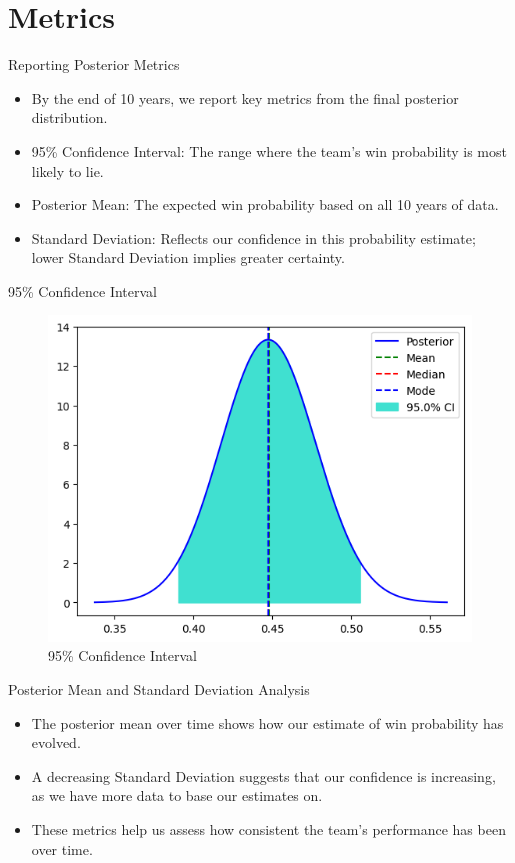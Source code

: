 \section{Metrics}

\begin{frame}{Reporting Posterior Metrics}

  \begin{itemize}
    \item By the end of 10 years, we report key metrics from the final posterior distribution.
    \item 95\% Confidence Interval: The range where the team’s win probability is most likely to lie.
    \item Posterior Mean: The expected win probability based on all 10 years of data.
    \item Standard Deviation: Reflects our confidence in this probability estimate; lower Standard Deviation implies greater certainty.
  \end{itemize}
  
\end{frame}

\begin{frame}{95\% Confidence Interval}

\begin{figure}
  \centering
  \includegraphics[width=.8\linewidth]{../Report/images/confidence-interval.png}
  \caption{95\% Confidence Interval}
\end{figure}
  
\end{frame}

\begin{frame}{Posterior Mean and Standard Deviation Analysis}

  \begin{itemize}
    \item The posterior mean over time shows how our estimate of win probability has evolved.
    \item A decreasing Standard Deviation suggests that our confidence is increasing, as we have more data to base our estimates on.
    \item These metrics help us assess how consistent the team’s performance has been over time.
  \end{itemize}
  
\end{frame}

